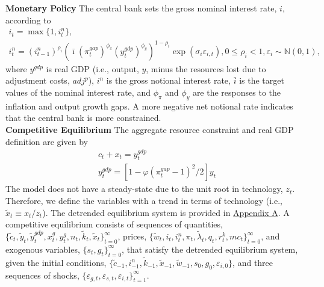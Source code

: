 \documentclass[12pt, final]{article}
\begin{document}
\noindent
\textbf{Monetary Policy} The central bank sets the gross nominal interest rate, $i$, according to
\begin{gather}
    \label{eq:15}
    i_t=\max\{1,i_t^n\},\\
      \label{eq:16}
  i_t^n=(i^n_{t-1})^{\rho_i}(\bar{\imath}(\pi^{gap}_t)^{\phi_\pi}(y^{gdp}_{t})^{\phi_y})^{1-\rho_i}\exp(\sigma_i\varepsilon_{i,t}), 0 \leq \rho_i < 1, \varepsilon_i \sim \mathds{N}(0,1),
  \end{gather}
where $y^{gdp}$ is real GDP (i.e., output, $y$, minus the resources lost due to adjustment costs, $adj^p$), $i^n$ is the gross notional interest rate, $\bar i$ is the target values of the nominal interest rate, and $\phi_\pi$ and $\phi_y$ are the responses to the inflation and output growth gaps. A more negative net notional rate indicates that the central bank is more constrained.\\

\noindent
\textbf{Competitive Equilibrium} The aggregate resource constraint and real GDP definition are given by
\begin{gather}
  c_t + x_t = y_t^{gdp}\\
  y_t^{gdp} = [1 - \varphi(\pi_t^{gap}-1)^2/2]y_t
\end{gather}
The model does not have a steady-state due to the unit root in technology, $z_t$. Therefore, we define the variables with a trend in terms of technology (i.e., $\tilde{x}_t \equiv x_t/z_t$). The detrended equilibrium system is provided in \hyperlink{Appendix A}{Appendix A}. A competitive equilibrium consists of sequences of quantities, $\{\tilde{c}_t, \tilde{y}_t, \tilde{y}_t^{gdp}, x^g_t, y^g_t, n_t, \tilde{k}_t, \tilde{x}_t\}_{t=0}^\infty$, prices, $\{\tilde{w}_t, i_t, i^n_t, \pi_t, \tilde{\lambda}_t, q_t, r^k_t, mc_t\}_{t=0}^\infty$, and exogenous variables, $\{s_t,g_t\}_{t=0}^\infty$, that satisfy the detrended equilibrium system, given the initial conditions, $\{\tilde{c}_{-1}, i^n_{-1}, \tilde{k}_{-1}, \tilde{x}_{-1}, \tilde{w}_{-1}, s_0, g_0, \varepsilon_{i,0}\}$, and three sequences of shocks, $\{\varepsilon_{g,t}, \varepsilon_{s,t}, \varepsilon_{i,t}\}_{t=1}^\infty$.
\end{document}
